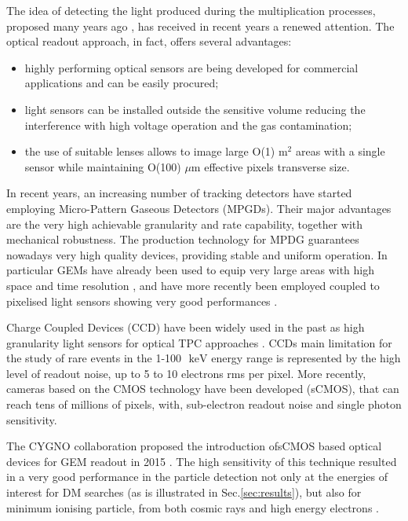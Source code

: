 \documentclass[physics,article,submit,moreauthors,pdftex]{Definitions/mdpi}
\newcommand{\keV}{\ensuremath{\,\textrm{keV}}\xspace}
\begin{document}
The idea of detecting the light produced during the multiplication processes, proposed many years ago \cite{bib:charpak}, has received in recent years a renewed attention. The optical readout approach, in fact, offers several advantages:
\begin{itemize}
\item highly performing optical sensors are being developed for commercial applications and can be easily procured;
\item light sensors can be installed outside the sensitive volume reducing the interference with high voltage operation and the gas contamination;
\item the use of suitable lenses allows to image large O(1) m$^2$ areas with a single sensor while maintaining O(100) $\mu$m effective pixels transverse size.
\end{itemize}

In recent years, an increasing number of tracking detectors have started employing 
Micro-Pattern Gaseous Detectors (MPGDs). Their major advantages are the very high achievable granularity and rate capability, together with mechanical robustness. The production technology for MPDG guarantees nowadays very high quality devices, providing stable and uniform operation. In particular GEMs \cite{bib:gem} have already been used to equip very large areas with high space and time resolution \cite{bib:alice}, and have more recently been employed coupled to pixelised light sensors showing very good performances \cite{bib:ref1, bib:jinst_orange1, bib:loomba, bib:Fraga}.

Charge Coupled Devices (CCD) have been widely used in the past as high granularity light sensors for optical TPC approaches \citep{bib:ccd1, bib:loomba, bib:ccd2}. CCDs main limitation for the study of rare events in the 1-100~\keV energy range is represented by the high level of readout noise, up to 5 to 10 electrons rms per pixel. More recently, cameras based on the CMOS technology have been developed (sCMOS), that can reach tens of millions of pixels, with, sub-electron readout noise and single photon sensitivity. 

The CYGNO collaboration proposed the introduction ofsCMOS based optical devices for GEM readout in 2015  \cite{bib:nim_orange1}. The high sensitivity of this technique resulted in a very good performance in the particle detection not only at the energies of interest for DM searches (as is illustrated in Sec.\ref{sec:results}), but also for minimum ionising particle, from both cosmic rays and high energy electrons  \cite{ bib:jinst_orange1, bib:jinst_orange2, bib:ieee_orange, bib:elba, bib:lemon_btf}. 
\end{document}
